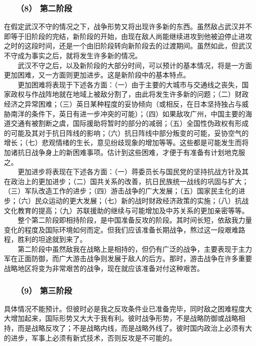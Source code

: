 \documentclass[cn,11pt,chinese]{elegantbook}
\def\myformat#1{\hfil\hfil #1}
\begin{document}
\subsubsection*{\myformat{　　（8） 第二阶段}}
在假定武汉不守的情况之下，战争形势又将出现许多新的东西。虽然敌占武汉并不即等于旧阶段的完结，新阶段的开始，由现在敌人尚能继续进攻到他被迫停止进攻之时的这段时间，还是一个由旧阶段转向新阶段去的过渡期间。虽然如此，但武汉不守成为事实之后，就将发生许多新的情况。\\
　　武汉不守之后，以及新阶段的大部分时间，可以预计的基本情况，将是一方面更加困难，又一方面则更加进步。这是新阶段中的基本特点。\\
　　更加困难将表现于下述各方面：（一）由于主要的大城市与交通线之丧失，国家政权与作战阵地就在地域上被敌分割了，由此将发生许多新的问题；（二）财政经济之异常困难；（三）英日某种程度的妥协倾向（或相反，在日本坚持独占与威胁南洋的条件下，英日有进一步冲突的可能）；（四）如果敌攻广州，中国主要的海道交通有被割断之虞，国际援助将暂时的部分的减弱；（五）全国性伪政权有形成的可能及其对于抗日阵线的影响；（六）抗日阵线中部分叛变的可能，妥协空气的增长；（七）悲观情绪的生长，意见纷歧现象的增加等等。这些都是可能发生而将加诸抗日战争身上的新困难事项。估计到这些困难，才便于有准备有计划地克服之。\\
　　更加进步将表现在下述各方面：（一）蒋委员长与国民党的坚持抗战方针及其在政治上的更加进步；（二）国共关系的改善，抗日民族统一战线的巩固与扩大；（三）军队改造工作的进步；（四）游击战争的广大发展；（五）国家民主化的进步；（六）民众运动的更大发展；（七）新的战时财政经济政策的实施；（八）抗战文化教育的提高；（九）苏联援助的继续与可能增加及中苏关系的更加亲密等等。\\
　　整个第二阶段即相持阶段，是中国准备反攻的阶段。其时间长短，依敌我力量变化的程度及国际环境如何而定。但我们应该准备长期战争，熬过这一段艰难路程，胜利的坦途就到来了。\\
　　第二阶段中虽然敌我在战略上是相持的，但仍有广泛的战争，主要表现于主力军在正面防御，而广大游击战争则发展于敌人的后方。那时，游击战争在许多重要战略地区将变为非常艰苦的战争，现在就应该准备对付这种艰苦。\\
\subsubsection*{\myformat{　　（9） 第三阶段}}
具体情况不能预计。但彼时必是我之反攻条件业已准备完毕，同时敌之困难程度大大增加起来，国际形势又大大于我有利。彼时战争形势，不是战略防御或战略相持，而是战略反攻了；不是战略内线，而是战略外线了。彼时国内政治上必须有大的进步，军事上必须有新式技术，否则反攻是不可能的。\\
\end{document}
